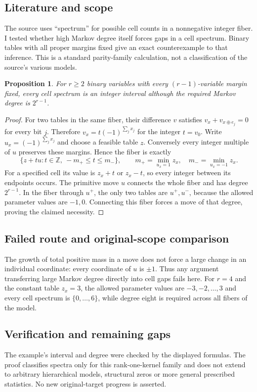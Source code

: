 \documentclass[11pt]{article}
\newtheorem{proposition}{Proposition}
\begin{document}
\subsection{Literature and scope}
The source uses ``spectrum'' for possible cell counts in a nonnegative integer fiber. I tested whether high Markov degree itself forces gaps in a cell spectrum. Binary tables with all proper margins fixed give an exact counterexample to that inference. This is a standard parity-family calculation, not a classification of the source's various models.
\begin{proposition}
For $r\ge2$ binary variables with every $(r-1)$-variable margin fixed, every cell spectrum is an integer interval although the required Markov degree is $2^{r-1}$.
\end{proposition}
\begin{proof}
For two tables in the same fiber, their difference $v$ satisfies $v_x+v_{x\oplus e_j}=0$ for every bit $j$. Therefore $v_x=t(-1)^{\sum_jx_j}$ for the integer $t=v_0$. Write $u_x=(-1)^{\sum_jx_j}$ and choose a feasible table $z$. Conversely every integer multiple of $u$ preserves these margins. Hence the fiber is exactly
\[
\{z+tu:t\in\mathbb Z,\ -m_+\le t\le m_-\},\qquad
m_+=\min_{u_x=1}z_x,\quad m_-=\min_{u_x=-1}z_x.
\]
For a specified cell its value is $z_x+t$ or $z_x-t$, so every integer between its endpoints occurs. The primitive move $u$ connects the whole fiber and has degree $2^{r-1}$. In the fiber through $u^+$, the only two tables are $u^+,u^-$, because the allowed parameter values are $-1,0$. Connecting this fiber forces a move of that degree, proving the claimed necessity.
\end{proof}
\subsection{Failed route and original-scope comparison}
The growth of total positive mass in a move does not force a large change in an individual coordinate: every coordinate of $u$ is $\pm1$. Thus any argument transferring large Markov degree directly into cell gaps fails here. For $r=4$ and the constant table $z_x=3$, the allowed parameter values are $-3,-2,\ldots,3$ and every cell spectrum is $\{0,\ldots,6\}$, while degree eight is required across all fibers of the model.
\subsection{Verification and remaining gaps}
The example's interval and degree were checked by the displayed formulas. The proof classifies spectra only for this rank-one-kernel family and does not extend to arbitrary hierarchical models, structural zeros or more general prescribed statistics. No new original-target progress is asserted.
\end{document}
